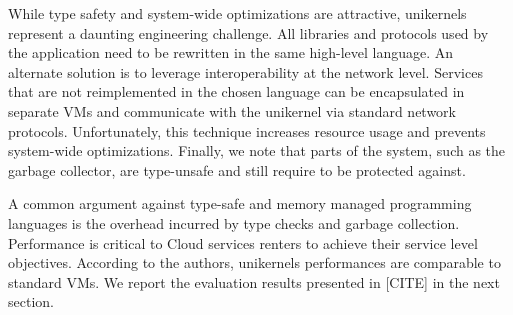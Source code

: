 While type safety and system-wide optimizations are attractive, unikernels represent a daunting engineering challenge.
All libraries and protocols used by the application need to be rewritten in the same high-level language.
An alternate solution is to leverage interoperability at the network level.
Services that are not reimplemented in the chosen language can be encapsulated in separate VMs and communicate with the unikernel via standard network protocols.
Unfortunately, this technique increases resource usage and prevents system-wide optimizations.
Finally, we note that parts of the system, such as the garbage collector, are type-unsafe and still require to be protected against. 

A common argument against type-safe and memory managed programming languages is the overhead incurred by type checks and garbage collection.
Performance is critical to Cloud services renters to achieve their service level objectives.
According to the authors, unikernels performances are comparable to standard VMs.
We report the evaluation results presented in [CITE] in the next section.

